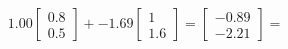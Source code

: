 \documentclass[preview]{standalone}
\begin{document}
\begin{align*}
1.00 \begin{bmatrix} 0.8 \\ 0.5 \end{bmatrix} + -1.69 \begin{bmatrix} 1 \\ 1.6 \end{bmatrix} = \begin{bmatrix} -0.89 \\ -2.21 \end{bmatrix} =
\end{align*}
\end{document}
